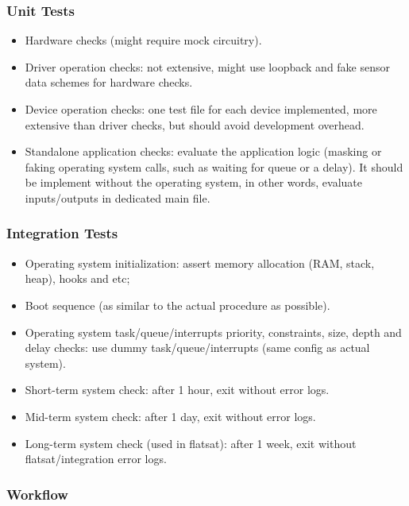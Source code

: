 \subsubsection{Unit Tests}

\begin{itemize}
    \item Hardware checks (might require mock circuitry).
    \item Driver operation checks: not extensive, might use loopback and fake sensor data schemes for hardware checks.
    \item Device operation checks: one test file for each device implemented, more extensive than driver checks, but should avoid development overhead.
    \item Standalone application checks: evaluate the application logic (masking or faking operating system calls, such as waiting for queue or a delay). It should be implement without the operating system, in other words, evaluate inputs/outputs in dedicated main file.
\end{itemize}

\subsubsection{Integration Tests}

\begin{itemize}
    \item Operating system initialization: assert memory allocation (RAM, stack, heap), hooks and etc;
    \item Boot sequence (as similar to the actual procedure as possible).
    \item Operating system task/queue/interrupts priority, constraints, size, depth and delay checks: use dummy task/queue/interrupts (same config as actual system).
    \item Short-term system check: after 1 hour, exit without error logs.
    \item Mid-term system check: after 1 day, exit without error logs.
    \item Long-term system check (used in flatsat): after 1 week, exit without flatsat/integration error logs.
\end{itemize}

\subsubsection{Workflow}

